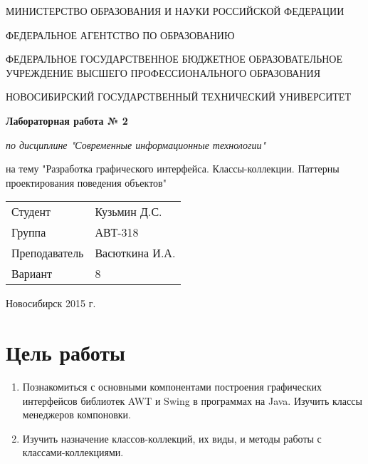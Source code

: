 \documentclass{article}
\begin{document}
\begin{center}
МИНИСТЕРСТВО ОБРАЗОВАНИЯ И НАУКИ РОССИЙСКОЙ ФЕДЕРАЦИИ
\vspace{20pt}

ФЕДЕРАЛЬНОЕ  АГЕНТСТВО  ПО  ОБРАЗОВАНИЮ

ФЕДЕРАЛЬНОЕ  ГОСУДАРСТВЕННОЕ  БЮДЖЕТНОЕ ОБРАЗОВАТЕЛЬНОЕ  УЧРЕЖДЕНИЕ 
ВЫСШЕГО  ПРОФЕССИОНАЛЬНОГО  ОБРАЗОВАНИЯ

НОВОСИБИРСКИЙ  ГОСУДАРСТВЕННЫЙ  ТЕХНИЧЕСКИЙ  УНИВЕРСИТЕТ

\vspace{\fill}
{\bfseries \Large Лабораторная работа № 2}

{\itshape по дисциплине "Современные информационные технологии"}

на тему "Разработка графического интерфейса. 
Классы-коллекции.
Паттерны проектирования поведения объектов"
\vspace{\fill}

\begin{flushleft}
\begin{tabular}{ l l }
Студент & Кузьмин Д.С. \\
Группа & АВТ-318 \\
Преподаватель & Васюткина И.А. \\
Вариант & 8 \\
\end{tabular}
\end{flushleft}

\vspace{\fill}
Новосибирск 2015 г.
\end{center}
\pagebreak



\section*{Цель работы}

\begin{enumerate}
\item Познакомиться с основными компонентами построения графических интерфейсов библиотек AWT и Swing в программах на Java. Изучить классы менеджеров компоновки.
\item Изучить назначение классов-коллекций, их виды, и методы работы с классами-коллекциями.
\end{enumerate}
\end{document}
